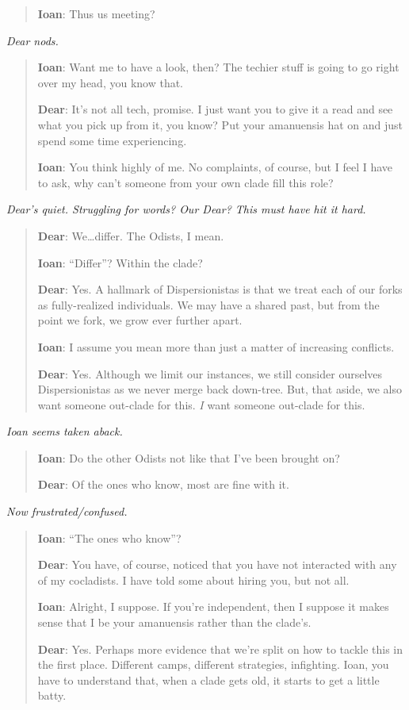 \begin{quote}
\textbf{Ioan}: Thus us meeting?
\end{quote}

\emph{Dear nods.}

\begin{quote}
\textbf{Ioan}: Want me to have a look, then? The techier stuff is going to go right over my head, you know that.

\textbf{Dear}: It's not all tech, promise. I just want you to give it a read and see what you pick up from it, you know? Put your amanuensis hat on and just spend some time experiencing.

\textbf{Ioan}: You think highly of me. No complaints, of course, but I feel I have to ask, why can't someone from your own clade fill this role?
\end{quote}

\emph{Dear's quiet. Struggling for words? Our Dear? This must have hit it hard.}

\begin{quote}
\textbf{Dear}: We\ldots{}differ. The Odists, I mean.

\textbf{Ioan}: ``Differ''? Within the clade?

\textbf{Dear}: Yes. A hallmark of Dispersionistas is that we treat each of our forks as fully-realized individuals. We may have a shared past, but from the point we fork, we grow ever further apart.

\textbf{Ioan}: I assume you mean more than just a matter of increasing conflicts.

\textbf{Dear}: Yes. Although we limit our instances, we still consider ourselves Dispersionistas as we never merge back down-tree. But, that aside, we also want someone out-clade for this. \emph{I} want someone out-clade for this.
\end{quote}

\emph{Ioan seems taken aback.}

\begin{quote}
\textbf{Ioan}: Do the other Odists not like that I've been brought on?

\textbf{Dear}: Of the ones who know, most are fine with it.
\end{quote}

\emph{Now frustrated/confused.}

\begin{quote}
\textbf{Ioan}: ``The ones who know''?

\textbf{Dear}: You have, of course, noticed that you have not interacted with any of my cocladists. I have told some about hiring you, but not all.

\textbf{Ioan}: Alright, I suppose. If you're independent, then I suppose it makes sense that I be your amanuensis rather than the clade's.

\textbf{Dear}: Yes. Perhaps more evidence that we're split on how to tackle this in the first place. Different camps, different strategies, infighting. Ioan, you have to understand that, when a clade gets old, it starts to get a little batty.
\end{quote}

